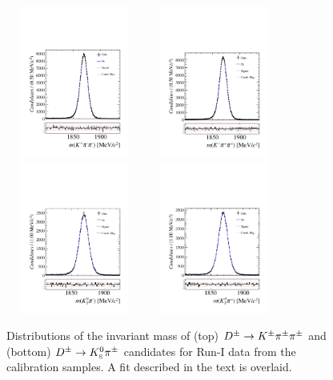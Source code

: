\begin{figure}[hp]
\centering
\includegraphics[height=5cm,width=0.4\textwidth]{figs/KpiAsym/fit_negative_kpipi_11up.pdf}
\includegraphics[height=5cm,width=0.4\textwidth]{figs/KpiAsym/fit_positive_kpipi_11up.pdf}\\
\includegraphics[height=5cm,width=0.4\textwidth]{figs/KpiAsym/fit_negative_kspi_11up.pdf}
\includegraphics[height=5cm,width=0.4\textwidth]{figs/KpiAsym/fit_positive_kspi_11up.pdf}
\caption{Distributions of the invariant mass of (top) ${{D}^\pm}\rightarrow{\ensuremath{{K}^\pm}}{\ensuremath{{\pi}^\pm}}{\ensuremath{{\pi}^\pm}}$ and (bottom) ${{D}^\pm}\rightarrow{\ensuremath{{K}^0_{\mathrm{ \scriptscriptstyle S}}}}{\ensuremath{{\pi}^\pm}}$ candidates for Run-I data from the calibration samples. A fit described in the text is overlaid.}

\end{figure}
